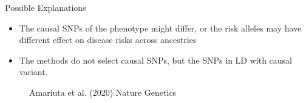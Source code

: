 \documentclass{beamer}
\begin{document}
\begin{frame}{Possible Explanations}

\begin{itemize}
    \item The causal SNPs of the phenotype might differ, or the risk alleles may have different effect on disease risks across ancestries
    \item The methods do not select causal SNPs, but the SNPs in LD with causal variant. 
\end{itemize}

\begin{figure}[h]	\noindent{}
    \label{fig:LD}
            {\tiny Amariuta et al. (2020) Nature Genetics}
\end{figure}
    
\end{frame}

\end{document}
